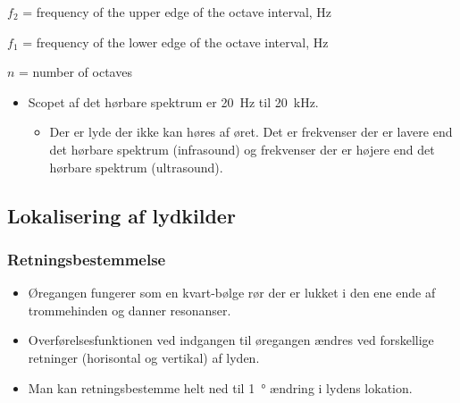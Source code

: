 \begin{description}
	\item $f_2$ = frequency of the upper edge of the octave interval, \si{\hertz}
	\item $f_1$ = frequency of the lower edge of the octave interval, \si{\hertz}
	\item $n$ = number of octaves
\end{description}

\begin{itemize}
	\item Scopet af det hørbare spektrum er \SI{20}{\hertz} til \SI{20}{\kilo\hertz}.
	\begin{itemize}
		\item Der er lyde der ikke kan høres af øret. Det er frekvenser der er lavere end det hørbare spektrum (infrasound) og frekvenser der er højere end det hørbare spektrum (ultrasound).
	\end{itemize}
\end{itemize}

\subsection{Lokalisering af lydkilder}
\subsubsection{Retningsbestemmelse}
\begin{itemize}
	\item Øregangen fungerer som en kvart-bølge rør der er lukket i den ene ende af trommehinden og danner resonanser.
	\item Overførelsesfunktionen ved indgangen til øregangen ændres ved forskellige retninger (horisontal og vertikal) af lyden.
	\item Man kan retningsbestemme helt ned til \SI{1}{\degree} ændring i lydens lokation.
\end{itemize}

